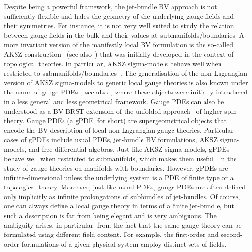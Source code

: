 \documentclass[pdftex]{sigma}
\numberwithin{equation}{section}
\theoremstyle{definition}
\begin{document}
Despite being a powerful framework, the jet-bundle BV approach is not sufficiently flexible and hides the geometry of the underlying gauge fields and their symmetries. For instance, it is not very well suited to study the relation between gauge fields in the bulk and their values at~submanifolds/boundaries. A more invariant version of the manifestly local BV formulation is the so-called AKSZ construction~\cite{Alexandrov:1995kv} (see also~\cite{Barnich:2009jy,Batalin:2001fc,Bonavolonta:2013mza,Bonechi:2009kx,Cattaneo:1999fm,Cattaneo:2001ys,Grigoriev:1999qz,Ikeda:2012pv,Roytenberg:2002nu}) that was initially developed in the context of topological theories. In particular, AKSZ sigma-models behave well when restricted to submanifolds/boundaries~\cite{Barnich:2003wj,Barnich:2006hbb,Cattaneo:2012qu,Cattaneo:2015vsa, Grigoriev:1999qz}. The generalisation of the non-Lagrangian version of AKSZ sigma-models to generic local gauge theories is also known under the name of gauge PDEs~\cite{Grigoriev:2019ojp}, see also~\cite{Barnich:2010sw, Barnich:2004cr}, where these objects were initially introduced in a less general and less geometrical framework. Gauge PDEs can also be understood as a BV-BRST extension of the unfolded approach~\cite{Vasiliev:1988xc,Vasiliev:2005zu} of higher spin theory.
Gauge PDEs (a gPDE, for short) are supergeometrical objects that encode the BV description of local non-Lagrangian gauge theories. Particular cases of gPDEs include usual PDEs, jet-bundle BV formulations, AKSZ sigma-models, and free differential algebras. Just like AKSZ sigma-models, gPDEs behave well when restricted to submanifolds, which makes them useful~\cite{Bekaert:2013zya,Bekaert:2012vt,Bekaert:2017bpy,Chekmenev:2015kzf,Grigoriev:2023kkk} in the study of gauge theories on manifolds with boundaries. However, gPDEs are infinite-dimensional unless the underlying system is a PDE of finite type or a
topological theory. Moreover, just like usual PDEs, gauge PDEs are often defined only implicitly as infinite prolongations of subbundles of jet-bundles. Of course, one can always define a local gauge theory in terms of a finite jet-bundle, but such a description is far from being elegant and is very ambiguous. The ambiguity arises, in particular, from the fact that the same gauge theory can be formulated using different field content. For example, the first-order and second-order formulations of a given physical system employ distinct sets of fields.
\end{document}
